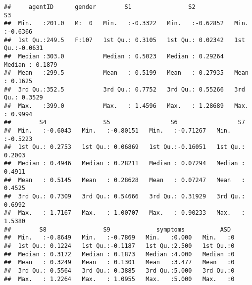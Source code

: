 \documentclass[]{article}
\begin{document}
\begin{verbatim}
##     agentID      gender        S1                S2                 S3         
##  Min.   :201.0   M:  0   Min.   :-0.3322   Min.   :-0.62852   Min.   :-0.6366  
##  1st Qu.:249.5   F:107   1st Qu.: 0.3105   1st Qu.: 0.02342   1st Qu.:-0.0631  
##  Median :303.0           Median : 0.5023   Median : 0.29264   Median : 0.1879  
##  Mean   :299.5           Mean   : 0.5199   Mean   : 0.27935   Mean   : 0.1625  
##  3rd Qu.:352.5           3rd Qu.: 0.7752   3rd Qu.: 0.55266   3rd Qu.: 0.3529  
##  Max.   :399.0           Max.   : 1.4596   Max.   : 1.28689   Max.   : 0.9994  
##        S4                S5                 S6                 S7         
##  Min.   :-0.6043   Min.   :-0.80151   Min.   :-0.71267   Min.   :-0.5223  
##  1st Qu.: 0.2753   1st Qu.: 0.06869   1st Qu.:-0.16051   1st Qu.: 0.2003  
##  Median : 0.4946   Median : 0.28211   Median : 0.07294   Median : 0.4911  
##  Mean   : 0.5145   Mean   : 0.28628   Mean   : 0.07247   Mean   : 0.4525  
##  3rd Qu.: 0.7309   3rd Qu.: 0.54666   3rd Qu.: 0.31929   3rd Qu.: 0.6992  
##  Max.   : 1.7167   Max.   : 1.00707   Max.   : 0.90233   Max.   : 1.5380  
##        S8                S9             symptoms          ASD   
##  Min.   :-0.8649   Min.   :-0.7869   Min.   :0.000   Min.   :0  
##  1st Qu.: 0.1224   1st Qu.:-0.1187   1st Qu.:2.500   1st Qu.:0  
##  Median : 0.3172   Median : 0.1873   Median :4.000   Median :0  
##  Mean   : 0.3249   Mean   : 0.1301   Mean   :3.477   Mean   :0  
##  3rd Qu.: 0.5564   3rd Qu.: 0.3885   3rd Qu.:5.000   3rd Qu.:0  
##  Max.   : 1.2264   Max.   : 1.0955   Max.   :5.000   Max.   :0
\end{verbatim}
\end{document}
